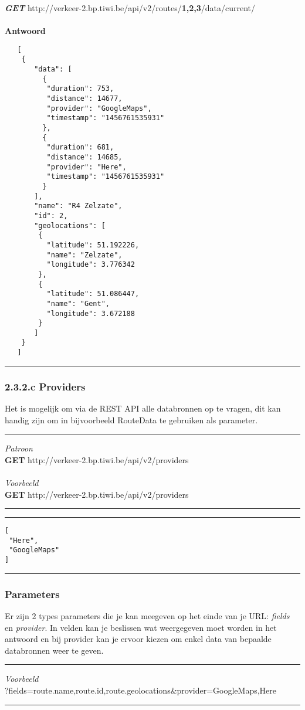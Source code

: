 \documentclass[ps,a4paper,oneside]{report}
\begin{document}
\textbf{\textit{GET}} http://verkeer-2.bp.tiwi.be/api/v2/routes/\textbf{1,2,3}/data/current/\\\\
\textbf{Antwoord}
\begin{verbatim}
   [
    {
       "data": [
         {
          "duration": 753,
          "distance": 14677,
          "provider": "GoogleMaps",
          "timestamp": "1456761535931"
         },
         {
          "duration": 681,
          "distance": 14685,
          "provider": "Here",
          "timestamp": "1456761535931"
         }
       ],
       "name": "R4 Zelzate",
       "id": 2,
       "geolocations": [
        {
          "latitude": 51.192226,
          "name": "Zelzate",
          "longitude": 3.776342
        },
        {
          "latitude": 51.086447,
          "name": "Gent",
          "longitude": 3.672188
        }
       ]
    }
   ]\end{verbatim}
\noindent\rule[0.5ex]{\linewidth}{1pt}
\subsubsection{2.3.2.c Providers}
Het is mogelijk om via de REST API alle databronnen op te vragen, dit kan handig zijn om in bijvoorbeeld RouteData te gebruiken als parameter.\\
\noindent\rule[0.5ex]{\linewidth}{1pt}
\textit{Patroon}\\
\textbf{GET} http://verkeer-2.bp.tiwi.be/api/v2/providers\\\\
\textit{Voorbeeld}\\
\textbf{GET} http://verkeer-2.bp.tiwi.be/api/v2/providers\\
\noindent\rule[0.5ex]{\linewidth}{1pt}
\noindent\rule[0.5ex]{\linewidth}{1pt}
\begin{verbatim}
[
 "Here",
 "GoogleMaps"
]
\end{verbatim}
\noindent\rule[0.5ex]{\linewidth}{1pt}
\subsubsection{Parameters}
Er zijn 2 types parameters die je kan meegeven op het einde van je URL: \textit{fields} en \textit{provider}. In velden kan je beslissen wat weergegeven moet worden in het antwoord en bij provider kan je ervoor kiezen om enkel data van bepaalde databronnen weer te geven.\\
\noindent\rule[0.5ex]{\linewidth}{1pt}
\textit{Voorbeeld}\\
?fields=route.name,route.id,route.geolocations\&provider=GoogleMaps,Here\\
\noindent\rule[0.5ex]{\linewidth}{1pt}
\end{document}
